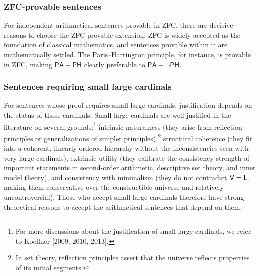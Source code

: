 \documentclass[a4paper,12pt]{amsart}
\theoremstyle{definition}
\numberwithin{equation}{section}
\begin{document}
\subsubsection{{\sf ZFC}-provable sentences}
For independent arithmetical sentences provable in {\sf ZFC}, there are decisive reasons to choose the {\sf ZFC}-provable extension. {\sf ZFC} is widely 
accepted as the foundation of classical mathematics, and sentences 
provable within it are mathematically settled. The Paris--Harrington 
principle, for instance, is provable in {\sf ZFC}, making 
$\mathsf{PA}+\mathsf{PH}$ clearly preferable to $\mathsf{PA}+\neg\mathsf{PH}$.
 
\subsubsection{Sentences requiring small large cardinals}
For sentences whose proof requires small large cardinals, justification 
depends on the status of those cardinals. Small large cardinals are 
well-justified in the literature on several grounds:\footnote{For more discussions about the justification of small large cardinals, we refer to Koellner [2009, 2010, 2013].} intrinsic 
naturalness (they arise from reflection principles or generalizations 
of simpler principles),\footnote{In set theory, reflection principles assert that the universe reflects properties of its initial segments.} structural coherence (they fit into a coherent, 
linearly ordered hierarchy without the inconsistencies seen with very 
large cardinals), extrinsic utility (they calibrate the consistency 
strength of important statements in second-order arithmetic, descriptive set theory, and inner model theory), and consistency with minimalism (they do not contradict $\sf V=L$, making them conservative 
over the constructible universe and relatively uncontroversial). Those 
who accept small large cardinals therefore have strong theoretical 
reasons to accept the arithmetical sentences that depend on them.


 
\end{document}
